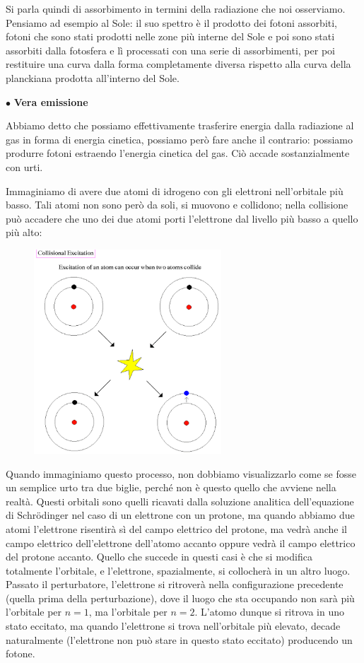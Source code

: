 Si parla quindi di assorbimento in termini della radiazione che noi osserviamo. Pensiamo ad esempio al Sole: il suo spettro è il prodotto dei fotoni assorbiti, fotoni che sono stati prodotti nelle zone più interne del Sole e poi sono stati assorbiti dalla fotosfera e lì processati con una serie di assorbimenti, per poi restituire una curva dalla forma completamente diversa rispetto alla curva della planckiana prodotta all'interno del Sole.

\vspace{0.2cm}$\bullet$ \textbf{Vera emissione}

Abbiamo detto che possiamo effettivamente trasferire energia dalla radiazione al gas in forma di energia cinetica, possiamo però fare anche il contrario: possiamo produrre fotoni estraendo l'energia cinetica del gas. Ciò accade sostanzialmente con urti.

Immaginiamo di avere due atomi di idrogeno con gli elettroni nell'orbitale più basso. Tali atomi non sono però da soli, si muovono e collidono; nella collisione può accadere che uno dei due atomi porti l'elettrone dal livello più basso a quello più alto:

\begin{figure}[H]
    \centering
    \includegraphics [width=7cm]{28-10.6(eccitazione_per_collisione).png}
    \label{fig:eccitazione_per_collisione}
\end{figure}

Quando immaginiamo questo processo, non dobbiamo visualizzarlo come se fosse un semplice urto tra due biglie, perché non è questo quello che avviene nella realtà. Questi orbitali sono quelli ricavati dalla soluzione analitica dell'equazione di Schrödinger nel caso di un elettrone con un protone, ma quando abbiamo due atomi l'elettrone risentirà sì del campo elettrico del protone, ma vedrà anche il campo elettrico dell'elettrone dell'atomo accanto oppure vedrà il campo elettrico del protone accanto. Quello che succede in questi casi è che si modifica totalmente l'orbitale, e l'elettrone, spazialmente, si collocherà in un altro luogo. Passato il perturbatore, l'elettrone si ritroverà nella configurazione precedente (quella prima della perturbazione), dove il luogo che sta occupando non sarà più l'orbitale per $n=1$, ma l'orbitale per $n=2$. L'atomo dunque si ritrova in uno stato eccitato, ma quando l'elettrone si trova nell'orbitale più elevato, decade naturalmente (l'elettrone non può stare in questo stato eccitato) producendo un fotone.

